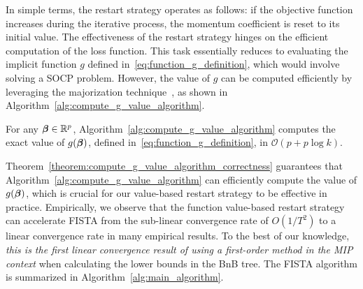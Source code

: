 In simple terms, the restart strategy operates as follows: if the objective function increases during the iterative process, the momentum coefficient is reset to its initial value.
The effectiveness of the restart strategy hinges on the efficient computation of the loss function. This task essentially reduces to evaluating the implicit function $g$ defined in~\eqref{eq:function_g_definition}, which would involve solving a SOCP problem.
However, the value of $g$ can be computed efficiently by leveraging the majorization technique~\citep{kim2022convexification}, as shown in Algorithm~\ref{alg:compute_g_value_algorithm}.



\begin{theorem}
    \label{theorem:compute_g_value_algorithm_correctness}
        For any $\bm{\beta} \in \mathbb{R}^p$, Algorithm~\ref{alg:compute_g_value_algorithm} computes the exact value of $g(\bm{\beta})$, defined in~\eqref{eq:function_g_definition}, in $\mathcal O(p + p \log k)$.
\vspace{-3mm}
\end{theorem}
Theorem~\ref{theorem:compute_g_value_algorithm_correctness} guarantees that Algorithm~\ref{alg:compute_g_value_algorithm} can efficiently compute the value of $g(\bm{\beta})$, which is crucial for our value-based restart strategy to be effective in practice.
Empirically, we observe that the function value-based restart strategy can accelerate FISTA from the sub-linear convergence rate of \(O(1/T^2)\) to a linear convergence rate in many empirical results.
To the best of our knowledge, \textit{this is the first linear convergence result of using a first-order method in the MIP context} when calculating the lower bounds in the BnB tree.
The FISTA algorithm is summarized in Algorithm~\ref{alg:main_algorithm}.



\vspace{-3mm}
